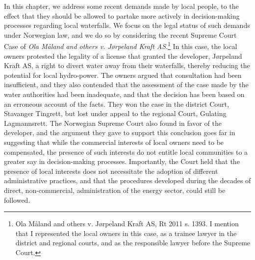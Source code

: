 In this chapter, we address some recent demands made by local people, to the effect that they should be allowed to partake more actively in decision-making processes regarding local waterfalls. We focus on the legal status of such demands under Norwegian law, and we do so by considering the recent Supreme Court Case of \emph{Ola Måland and others v. Jørpeland Kraft AS}.\footnote{Ola M{\aa}land and others v. J{\o}rpeland Kraft AS, Rt 2011 s. 1393. I mention that I represented the local owners in this case, as a trainee lawyer in the district and regional courts, and as the responsible lawyer before the Supreme Court.} In this case, the local owners protested the legality of a license that granted the developer, Jørpeland Kraft AS, a right to divert water away from their waterfalls, thereby reducing the potential for local hydro-power. The owners argued that consultation had been insufficient, and they also contended that the assessment of the case made by the water authorities had been inadequate, and that the decision has been based on an erroneous account of the facts. They won the case in the district Court, Stavanger Tingrett, but lost under appeal to the regional Court, Gulating Lagmannsrett. The Norwegian Supreme Court also found in favor of the developer, and the argument they gave to support this conclusion goes far in suggesting that while the commercial interests of local owners need to be compensated, the presence of such interests do not entitle local communities to a greater say in decision-making processes. Importantly, the Court held that the presence of local interests does not necessitate the adoption of different administrative practices, and that the procedures developed during the decades of direct, non-commercial, administration of the energy sector, could still be followed.

